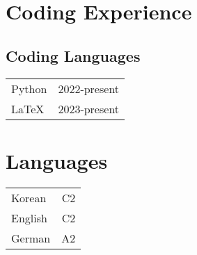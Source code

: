 \documentclass[11pt]{article}
\begin{document}
\section{Coding Experience}
\subsection{Coding Languages}
\begin{tabularx}{\textwidth}{X r}
Python & 2022-present \\
LaTeX & 2023-present \\
\end{tabularx}
\vspace{0.3cm}

\section{Languages}
\begin{tabularx}{\textwidth}{X r}
Korean & C2\\
English & C2 \\
German & A2 \\
\end{tabularx}
\vspace{0.8cm}
\end{document}
